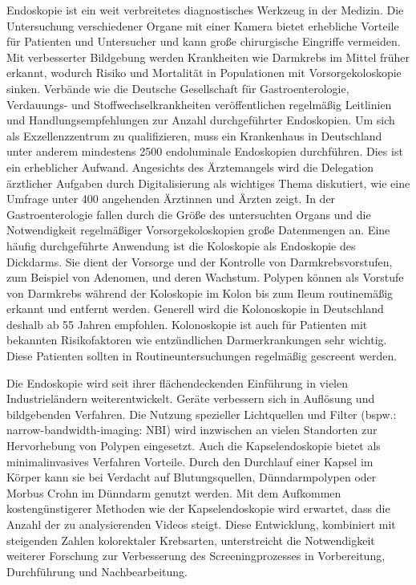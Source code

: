 Endoskopie ist ein weit verbreitetes diagnostisches Werkzeug in der Medizin. Die Untersuchung verschiedener Organe mit einer Kamera bietet erhebliche Vorteile für Patienten und Untersucher und kann große chirurgische Eingriffe vermeiden. Mit verbesserter Bildgebung werden Krankheiten wie Darmkrebs im Mittel früher erkannt, wodurch Risiko und Mortalität in Populationen mit Vorsorgekoloskopie sinken. \cite{doi:10.1056/NEJMoa2208375}\cite{Doubeni291}\cite{doi:10.7326/M17-0723} Verbände wie die Deutsche Gesellschaft für Gastroenterologie, Verdauungs- und Stoffwechselkrankheiten veröffentlichen regelmäßig Leitlinien und Handlungsempfehlungen zur Anzahl durchgeführter Endoskopien. Um sich als Exzellenzzentrum zu qualifizieren, muss ein Krankenhaus in Deutschland unter anderem mindestens 2500 endoluminale Endoskopien durchführen. \citep{dgav-ev-2015} Dies ist ein erheblicher Aufwand. Angesichts des Ärztemangels wird die Delegation ärztlicher Aufgaben durch Digitalisierung als wichtiges Thema diskutiert, wie eine Umfrage unter 400 angehenden Ärztinnen und Ärzten zeigt. \cite{Junghanns2025Ärztebarometer} In der Gastroenterologie fallen durch die Größe des untersuchten Organs und die Notwendigkeit regelmäßiger Vorsorgekoloskopien große Datenmengen an. Eine häufig durchgeführte Anwendung ist die Koloskopie als Endoskopie des Dickdarms. Sie dient der Vorsorge und der Kontrolle von Darmkrebsvorstufen, zum Beispiel von Adenomen, und deren Wachstum. Polypen können als Vorstufe von Darmkrebs während der Koloskopie im Kolon bis zum Ileum routinemäßig erkannt und entfernt werden. Generell wird die Kolonoskopie in Deutschland deshalb ab 55 Jahren empfohlen. Kolonoskopie ist auch für Patienten mit bekannten Risikofaktoren wie entzündlichen Darmerkrankungen sehr wichtig. \citep{vleggaar-2007} Diese Patienten sollten in Routineuntersuchungen regelmäßig gescreent werden. \citep{arnold-2020}

Die Endoskopie wird seit ihrer flächendeckenden Einführung in vielen Industrieländern weiterentwickelt. Geräte verbessern sich in Auflösung und bildgebenden Verfahren. Die Nutzung spezieller Lichtquellen und Filter (bspw.: narrow-bandwidth-imaging: NBI) wird inzwischen an vielen Standorten zur Hervorhebung von Polypen eingesetzt. \cite{yasushi2016nbi} Auch die Kapselendoskopie bietet als minimalinvasives Verfahren Vorteile. Durch den Durchlauf einer Kapsel im Körper kann sie bei Verdacht auf Blutungsquellen, Dünndarmpolypen oder Morbus Crohn im Dünndarm genutzt werden. Mit dem Aufkommen kostengünstigerer Methoden wie der Kapselendoskopie wird erwartet, dass die Anzahl der zu analysierenden Videos steigt. \citep{koulaouzƒidis-2021}\citep{8903282} Diese Entwicklung, kombiniert mit steigenden Zahlen kolorektaler Krebsarten, unterstreicht die Notwendigkeit weiterer Forschung zur Verbesserung des Screeningprozesses in Vorbereitung, Durchführung und Nachbearbeitung. \citep{acs-2024,ferlay-2024}\cite{kaminski-performance-2017}


